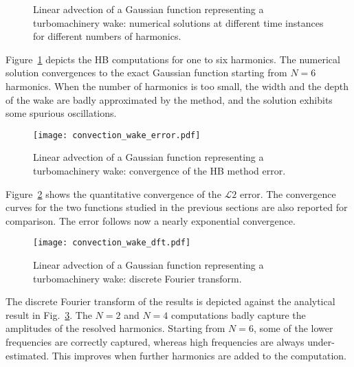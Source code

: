 \begin{figure}[htb]
  \centering
  \caption{Linear advection of a Gaussian function representing a turbomachinery wake: 
  numerical solutions at different time instances for different numbers of harmonics.}
  \label{fig:inj_wake_results}
\end{figure}
Figure~\ref{fig:inj_wake_results} depicts the HB
computations for one to six harmonics. The numerical solution convergences
to the exact Gaussian function starting from $N=6$ harmonics.
When the number of harmonics is
too small, the width and the depth of the wake are badly approximated
by the method, and the solution exhibits some spurious oscillations. 

\begin{figure}[htb]
  \centering
  \texttt{[image: convection\_wake\_error.pdf]}
  \caption{Linear advection of a Gaussian function representing a 
  turbomachinery wake: convergence of the HB method error.}
  \label{fig:conv_wake}
\end{figure}
Figure~\ref{fig:conv_wake} shows the quantitative convergence of 
the $\mathcal{L}2$ error. The
convergence curves for the two functions studied in the previous sections
are also reported for comparison.
The error follows now a nearly exponential convergence.
\begin{figure}[htb]
  \centering
  \texttt{[image: convection\_wake\_dft.pdf]}
  \caption{Linear advection of a Gaussian function representing a turbomachinery wake: 
  discrete Fourier transform.}
  \label{fig:dft_wake}
\end{figure}
The discrete Fourier transform of the results is
depicted against the analytical result in Fig.~\ref{fig:dft_wake}.
The $N=2$ and $N=4$ computations badly capture the amplitudes of the
resolved harmonics.
Starting from $N=6$, some of the lower 
frequencies are correctly captured, whereas high frequencies are
always under-estimated.
This improves when further harmonics are added to the computation.

